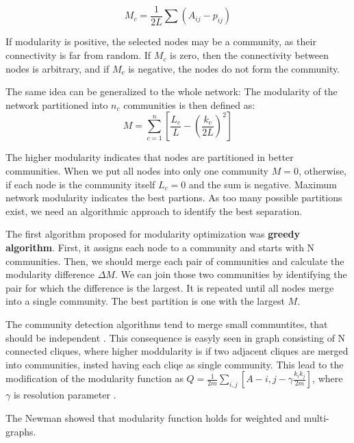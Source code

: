 \begin{equation}
M_c = \frac{1}{2L}\sum(A_{ij}-p_{ij})
\end{equation}

If modularity is positive, the selected nodes may be a community, as their connectivity is far from random. If $M_c$ is zero, then the connectivity between nodes is arbitrary, and if $M_c$ is negative, the nodes do not form the community. 

The same idea can be generalized to the whole network: The modularity of the network partitioned into $n_c$ communities is then defined as:
\begin{equation}
M=\sum_{c=1}^{n} [\frac{L_c}{L} - (\frac{k_c}{2L})^2]
\end{equation}

The higher modularity indicates that nodes are partitioned in better communities. When we put all nodes into only one community $M=0$, otherwise, if each node is the community itself $L_c=0$ and the sum is negative. Maximum network modularity indicates the best partions. As too many possible partitions exist, we need an algorithmic approach to identify the best separation. 

The first algorithm proposed for modularity optimization was \textbf{greedy algorithm}. First, it assigns each node to a community and starts with N communities. Then, we should merge each pair of communities and calculate the modularity difference $\Delta M$. We can join those two communities by identifying the pair for which the difference is the largest. It is repeated until all nodes merge into a single community. The best partition is one with the largest $M$.

The community detection algorithms tend to merge small communtites, that should be independent \cite{fortunato2007resolution}. This consequence is easyly seen in graph consisting of N connected cliques, where higher moddularity is if two adjacent cliques are merged into communities, insted having each cliqe as single community. This lead to the modification of the modularity function as $Q= \frac{1}{2m}\sum_{i,j}[A-{i,j} - \gamma \frac{k_ik_j}{2m}]$, where $\gamma$ is resolution parameter \cite{reichardt2006statistical}. 

The Newman showed that modularity function holds for weighted and multi-graphs. \cite{newman2004analysis} 

